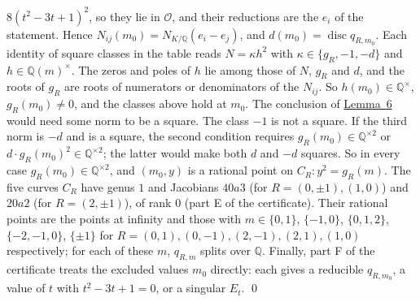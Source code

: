 \documentclass[11pt]{article}
\newcommand{\Q}{\mathbb Q}
\DeclareMathOperator{\disc}{disc}
\begin{document}
\(8(t^2-3t+1)^2\), so they lie in \(\mathcal O\), and their reductions are the \(e_i\) of the
statement. Hence \(N_{ij}(m_0)=N_{K/\Q}(e_i-e_j)\), and \(d(m_0)=\disc q_{R,m_0}\). Each identity
of square classes in the table reads \(N=\kappa h^2\) with \(\kappa\in\{g_R,-1,-d\}\) and
\(h\in\Q(m)^\times\). The zeros and poles of \(h\) lie among those of \(N\), \(g_R\) and \(d\), and
the roots of \(g_R\) are roots of numerators or denominators of the \(N_{ij}\). So
\(h(m_0)\in\Q^\times\), \(g_R(m_0)\neq0\), and the classes above hold at \(m_0\). The conclusion of \hyperref[lemma-cheb]{Lemma~6} would need some
norm to be a square. The class \(-1\) is not a square. If the third norm is \(-d\) and is a
square, the second condition requires \(g_R(m_0)\in\Q^{\times2}\) or \(d\cdot g_R(m_0)^2\in
\Q^{\times2}\); the latter would make both \(d\) and \(-d\) squares. So in every case
\(g_R(m_0)\in\Q^{\times2}\), and \((m_0,y)\) is a rational point on \(C_R:y^2=g_R(m)\). The five
curves \(C_R\) have genus \(1\) and Jacobians \(40a3\) (for \(R=(0,\pm1),(1,0)\)) and \(20a2\) (for
\(R=(2,\pm1)\)), of rank \(0\) (part E of the certificate). Their rational points are the points
at infinity and those with \(m\in\{0,1\}\), \(\{-1,0\}\), \(\{0,1,2\}\), \(\{-2,-1,0\}\),
\(\{\pm1\}\) for \(R=(0,1),(0,-1),(2,-1),(2,1),(1,0)\) respectively; for each of these \(m\),
\(q_{R,m}\) splits over \(\Q\). Finally, part F of the certificate treats the excluded values
\(m_0\) directly: each gives a reducible \(q_{R,m_0}\), a value of \(t\) with \(t^2-3t+1=0\), or a
singular \(E_t\). \qed
\end{document}
